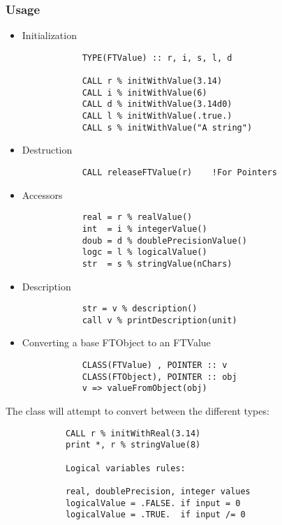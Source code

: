 \documentclass[9pt]{article}
\begin{document}
 \subsubsection{Usage}
\begin{itemize}
\item Initialization

{\color{blue}\begin{verbatim}
            TYPE(FTValue) :: r, i, s, l, d

            CALL r % initWithValue(3.14)
            CALL i % initWithValue(6)
            CALL d % initWithValue(3.14d0)
            CALL l % initWithValue(.true.)
            CALL s % initWithValue("A string")
\end{verbatim}}

\item Destruction 

{\color{blue}\begin{verbatim}
            CALL releaseFTValue(r)    !For Pointers
\end{verbatim}}

\item Accessors

{\color{blue}\begin{verbatim}
            real = r % realValue()
            int  = i % integerValue()
            doub = d % doublePrecisionValue()
            logc = l % logicalValue()
            str  = s % stringValue(nChars)
\end{verbatim}}

\item Description

{\color{blue}\begin{verbatim}
            str = v % description()
            call v % printDescription(unit)
\end{verbatim}}

\item Converting a base FTObject to an FTValue

{\color{blue}\begin{verbatim}
            CLASS(FTValue) , POINTER :: v
            CLASS(FTObject), POINTER :: obj
            v => valueFromObject(obj)
\end{verbatim}}
\end{itemize} 
 The class will attempt to convert between the different types:

{\color{blue}\begin{verbatim}
            CALL r % initWithReal(3.14)
            print *, r % stringValue(8)

            Logical variables rules:

            real, doublePrecision, integer values
            logicalValue = .FALSE. if input = 0
            logicalValue = .TRUE.  if input /= 0
\end{verbatim}}
\end{document}
